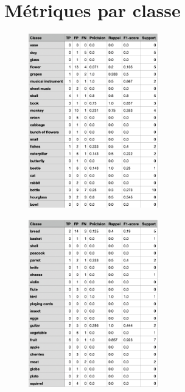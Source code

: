 \section{Métriques par classe}

\begin{figure}[H]
    \centering
    \includegraphics[width=0.5\textwidth]{annexes/tables/metricsYOLO1.png}
    \label{fig:YOLO1}
\end{figure}

\begin{figure}[H]
    \centering
    \includegraphics[width=0.5\textwidth]{annexes/tables/metricsYOLO2.png}
    \label{fig:YOLO2}
\end{figure}


